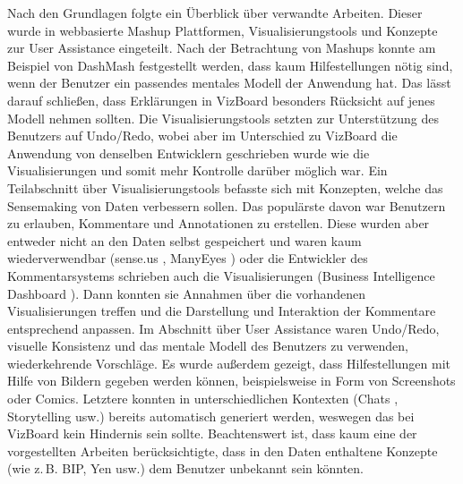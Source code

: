 \documentclass[
	headsepline,
	footsepline,
	fontsize=12pt,
	bibliography=totoc
]{scrbook}
\begin{document}



Nach den Grundlagen folgte ein Überblick über verwandte Arbeiten. Dieser wurde in webbasierte Mashup Plattformen, Visualisierungstools und Konzepte zur User Assistance eingeteilt. Nach der Betrachtung von Mashups konnte am Beispiel von DashMash festgestellt werden, dass kaum Hilfestellungen nötig sind, wenn der Benutzer ein passendes mentales Modell der Anwendung hat. Das lässt darauf schließen, dass Erklärungen in VizBoard besonders Rücksicht auf jenes Modell nehmen sollten. Die Visualisierungstools setzten zur Unterstützung des Benutzers auf Undo/Redo, wobei aber im Unterschied zu VizBoard die Anwendung von denselben Entwicklern geschrieben wurde wie die Visualisierungen und somit mehr Kontrolle darüber möglich war. Ein Teilabschnitt über Visualisierungstools befasste sich mit Konzepten, welche das Sensemaking von Daten verbessern sollen. Das populärste davon war Benutzern zu erlauben, Kommentare und Annotationen zu erstellen. Diese wurden aber entweder nicht an den Daten selbst gespeichert und waren kaum wiederverwendbar (sense.us \cite{Heer2007}, ManyEyes \cite{Viegas2007}) oder die Entwickler des Kommentarsystems schrieben auch die Visualisierungen (Business Intelligence Dashboard \cite{Elias2012}). Dann konnten sie Annahmen über die vorhandenen Visualisierungen treffen und die Darstellung und Interaktion der Kommentare entsprechend anpassen. Im Abschnitt über User Assistance waren Undo/Redo, visuelle Konsistenz und das mentale Modell des Benutzers zu verwenden, wiederkehrende Vorschläge. Es wurde außerdem gezeigt, dass Hilfestellungen mit Hilfe von Bildern gegeben werden können, beispielsweise in Form von Screenshots oder Comics. Letztere konnten in unterschiedlichen Kontexten (Chats \cite{Kurlander1996}, Storytelling \cite{Chan2009,Wen2012} usw.) bereits automatisch generiert werden, weswegen das bei VizBoard kein Hindernis sein sollte. Beachtenswert ist, dass kaum eine der vorgestellten Arbeiten berücksichtigte, dass in den Daten enthaltene Konzepte (wie z.\,B. BIP, Yen usw.) dem Benutzer unbekannt sein könnten.
\end{document}
